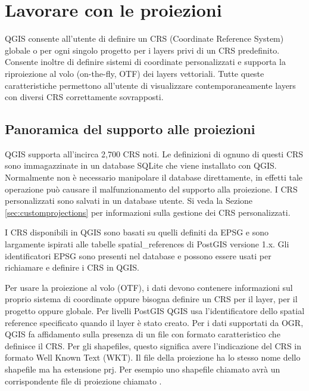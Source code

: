 
\section{Lavorare con le proiezioni}\label{label_projections}


QGIS consente all'utente di definire un CRS (Coordinate
Reference System) globale o per ogni singolo progetto per i layers privi di un
CRS predefinito. Consente inoltre di definire sistemi di coordinate
personalizzati e supporta la riproiezione al volo (on-the-fly, OTF) dei layers
vettoriali. Tutte queste caratteristiche permettono all'utente di visualizzare
contemporaneamente layers con diversi CRS correttamente sovrapposti.

\subsection{Panoramica del supporto alle proiezioni}\label{label_projoverview}

QGIS supporta all'incirca 2,700 CRS noti. Le definizioni di ognuno di questi
CRS sono immagazzinate in un database SQLite che viene installato con QGIS.
Normalmente non è necessario manipolare il database direttamente, in effetti
tale operazione può causare il malfunzionamento del supporto alla proiezione.
I CRS personalizzati sono salvati in un database utente.
Si veda la Sezione \ref{sec:customprojections} per informazioni
sulla gestione dei CRS personalizzati.

I CRS disponibili in QGIS sono basati su quelli definiti da EPSG
e sono largamente ispirati alle tabelle spatial\_references
di PostGIS versione 1.x. Gli identificatori EPSG sono presenti
nel database e possono essere usati per richiamare e definire i CRS in QGIS.

Per usare la proiezione al volo (OTF), i dati devono contenere informazioni
sul proprio sistema di coordinate oppure bisogna definire un CRS per il layer,
per il progetto oppure globale.
Per livelli PostGIS QGIS usa l'identificatore dello spatial reference
specificato quando il layer è stato creato. Per i dati supportati da OGR,
QGIS fa affidamento sulla presenza di un file con formato caratteristico che
definisce il CRS. Per gli shapefiles, questo significa avere l'indicazione del
CRS in formato Well Known Text (WKT). Il file della proiezione
ha lo stesso nome dello shapefile ma ha estensione prj. Per esempio uno
shapefile chiamato  avrà un corrispondente file di
proiezione chiamato .

